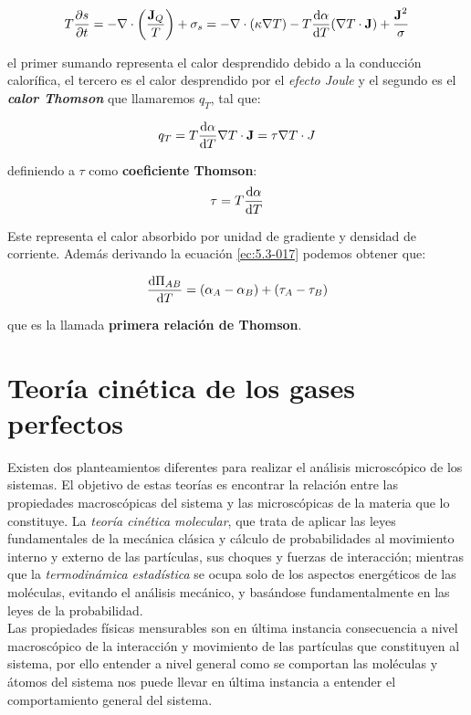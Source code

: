 \documentclass[12pt,a4paper,oneside]{book}
\begin{document}
\begin{equation}
T \frac{\partial s}{\partial t}  = - \nabla \cdot \left(  \dfrac{\textbf{J}_Q}{T} \right) + \sigma_s = - \nabla \cdot (\kappa \nabla T) - T \dfrac{\mathrm{d} \alpha}{\mathrm{d} T} (\nabla T \cdot \textbf{J}) + \dfrac{\textbf{J}^2}{\sigma}
\end{equation}

el primer sumando representa el calor desprendido debido a la conducción calorífica, el tercero es el calor desprendido por el \textit{efecto Joule} y el segundo es el
\textit{\textbf{calor Thomson}} que llamaremos $q_T$, tal que:

\begin{equation}
q_T = T \dfrac{\mathrm{d} \alpha}{\mathrm{d} T} \nabla T \cdot \textbf{J} = \tau \nabla T \cdot J
\end{equation} 

definiendo a $\tau$ como \textbf{coeficiente Thomson}:
\begin{equation}
\tau = T \dfrac{\mathrm{d} \alpha}{\mathrm{d} T}
\end{equation}

 Este representa el calor absorbido por unidad de gradiente y densidad de corriente. Además derivando la ecuación \ref{ec:5.3-017} podemos obtener que:

\begin{equation}
\dfrac{\mathrm{d} \Pi_{AB}}{\mathrm{d} T} = (\alpha_A - \alpha_B) + (\tau_A - \tau_B)
\end{equation}

que es la llamada \textbf{primera relación de Thomson}.

\chapter{Teoría cinética de los gases perfectos}

Existen dos planteamientos diferentes para realizar el análisis microscópico de los sistemas. El objetivo de estas teorías es encontrar la relación entre las propiedades macroscópicas del sistema y las microscópicas de la materia que lo constituye. La \textit{teoría cinética molecular}, que trata de aplicar las leyes fundamentales de la mecánica clásica y cálculo de probabilidades al movimiento interno y externo de las partículas, sus choques y fuerzas de interacción; mientras que la \textit{termodinámica estadística} se ocupa solo de los aspectos energéticos de  las moléculas, evitando el análisis mecánico, y basándose fundamentalmente en las leyes de la probabilidad. \\

Las propiedades físicas mensurables son en última instancia consecuencia a nivel macroscópico de la interacción y movimiento de las partículas que constituyen al sistema, por ello entender a nivel general como se comportan las moléculas y átomos del sistema nos puede llevar en última instancia a entender el comportamiento general del sistema. \\ 
\end{document}
